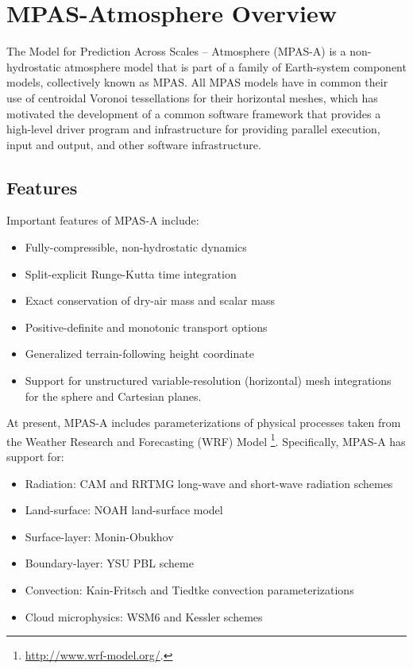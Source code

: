 
\chapter{MPAS-Atmosphere Overview}
\label{chap:atmosphere_overview}

The Model for Prediction Across Scales -- Atmosphere (MPAS-A) is a
non-hydrostatic atmosphere model that is part of a family of
Earth-system component models, collectively known as MPAS.  All MPAS
models have in common their use of centroidal Voronoi tessellations for
their horizontal meshes, which has motivated the development of a common
software framework that provides a high-level driver program and
infrastructure for providing parallel execution, input and output, and
other software infrastructure.

\section{Features}

Important features of MPAS-A include:

\begin{itemize}
\item Fully-compressible, non-hydrostatic dynamics
\item Split-explicit Runge-Kutta time integration
\item Exact conservation of dry-air mass and scalar mass
\item Positive-definite and monotonic transport options
\item Generalized terrain-following height coordinate
\item Support for unstructured variable-resolution (horizontal) mesh integrations for the sphere and Cartesian planes.
\end{itemize}

At present, MPAS-A includes parameterizations of physical processes
taken from the Weather Research and Forecasting (WRF) Model
\footnote{\url{http://www.wrf-model.org/}.}. Specifically, MPAS-A has
support for:

\begin{itemize}
\item Radiation: CAM and RRTMG long-wave and short-wave radiation schemes
\item Land-surface: NOAH land-surface model
\item Surface-layer: Monin-Obukhov
\item Boundary-layer: YSU PBL scheme
\item Convection: Kain-Fritsch and Tiedtke convection parameterizations
\item Cloud microphysics: WSM6 and Kessler schemes
\end{itemize}

